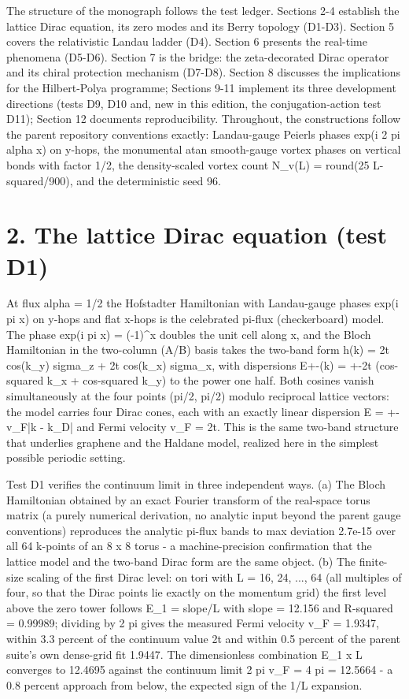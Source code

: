 \documentclass[11pt,a4paper]{article}
\begin{document}
The structure of the monograph follows the test ledger. Sections 2-4 establish the lattice Dirac equation, its zero modes and its Berry topology (D1-D3). Section 5 covers the relativistic Landau ladder (D4). Section 6 presents the real-time phenomena (D5-D6). Section 7 is the bridge: the zeta-decorated Dirac operator and its chiral protection mechanism (D7-D8). Section 8 discusses the implications for the Hilbert-Polya programme; Sections 9-11 implement its three development directions (tests D9, D10 and, new in this edition, the conjugation-action test D11); Section 12 documents reproducibility. Throughout, the constructions follow the parent repository conventions exactly: Landau-gauge Peierls phases exp(i 2 pi alpha x) on y-hops, the monumental atan smooth-gauge vortex phases on vertical bonds with factor 1/2, the density-scaled vortex count N\_\allowbreak{}v(L) = round(25 L-squared/900), and the deterministic seed 96.

\section{2. The lattice Dirac equation (test D1)}
At flux alpha = 1/2 the Hofstadter Hamiltonian with Landau-gauge phases exp(i pi x) on y-hops and flat x-hops is the celebrated pi-flux (checkerboard) model. The phase exp(i pi x) = (-1)\^{}x doubles the unit cell along x, and the Bloch Hamiltonian in the two-column (A/B) basis takes the two-band form h(k) = 2t cos(k\_\allowbreak{}y) sigma\_\allowbreak{}z + 2t cos(k\_\allowbreak{}x) sigma\_\allowbreak{}x, with dispersions E+-(k) = +-2t (cos-squared k\_\allowbreak{}x + cos-squared k\_\allowbreak{}y) to the power one half. Both cosines vanish simultaneously at the four points (pi/2, pi/2) modulo reciprocal lattice vectors: the model carries four Dirac cones, each with an exactly linear dispersion E = +-v\_\allowbreak{}F|k - k\_\allowbreak{}D| and Fermi velocity v\_\allowbreak{}F = 2t. This is the same two-band structure that underlies graphene and the Haldane model, realized here in the simplest possible periodic setting.

Test D1 verifies the continuum limit in three independent ways. (a) The Bloch Hamiltonian obtained by an exact Fourier transform of the real-space torus matrix (a purely numerical derivation, no analytic input beyond the parent gauge conventions) reproduces the analytic pi-flux bands to max deviation 2.7e-15 over all 64 k-points of an 8 x 8 torus - a machine-precision confirmation that the lattice model and the two-band Dirac form are the same object. (b) The finite-size scaling of the first Dirac level: on tori with L = 16, 24, ..., 64 (all multiples of four, so that the Dirac points lie exactly on the momentum grid) the first level above the zero tower follows E\_\allowbreak{}1 = slope/L with slope = 12.156 and R-squared = 0.99989; dividing by 2 pi gives the measured Fermi velocity v\_\allowbreak{}F = 1.9347, within 3.3 percent of the continuum value 2t and within 0.5 percent of the parent suite's own dense-grid fit 1.9447. The dimensionless combination E\_\allowbreak{}1 x L converges to 12.4695 against the continuum limit 2 pi v\_\allowbreak{}F = 4 pi = 12.5664 - a 0.8 percent approach from below, the expected sign of the 1/L expansion.
\end{document}
